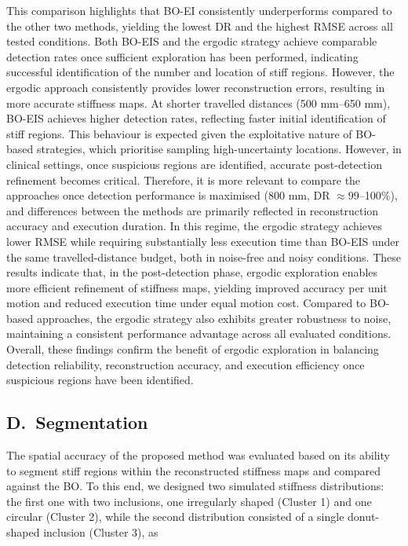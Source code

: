 \documentclass[11pt]{article}
\begin{document}
This comparison highlights that BO-EI consistently underperforms
compared to the other two methods, yielding the lowest DR and the
highest RMSE across all tested conditions. Both BO-EIS and the
ergodic strategy achieve comparable detection rates once sufficient
exploration has been performed, indicating successful identification
of the number and location of stiff regions. However, the ergodic
approach consistently provides lower reconstruction errors,
resulting in more accurate stiffness maps. At shorter travelled
distances (500 mm--650 mm), BO-EIS achieves higher detection rates,
reflecting faster initial identification of stiff regions. This
behaviour is expected given the exploitative nature of BO-based
strategies, which prioritise sampling high-uncertainty locations.
However, in clinical settings, once suspicious regions are
identified, accurate post-detection refinement becomes critical.
Therefore, it is more relevant to compare the approaches once
detection performance is maximised (800 mm, DR $\approx 99$--100\%),
and differences between the methods are primarily reflected in
reconstruction accuracy and execution duration. In this regime, the
ergodic strategy achieves lower RMSE while requiring substantially
less execution time than BO-EIS under the same travelled-distance
budget, both in noise-free and noisy conditions. These results
indicate that, in the post-detection phase, ergodic exploration
enables more efficient refinement of stiffness maps, yielding
improved accuracy per unit motion and reduced execution time under
equal motion cost. Compared to BO-based approaches, the ergodic
strategy also exhibits greater robustness to noise, maintaining a
consistent performance advantage across all evaluated conditions.
Overall, these findings confirm the benefit of ergodic exploration
in balancing detection reliability, reconstruction accuracy, and
execution efficiency once suspicious regions have been identified.

\subsection*{D.\ Segmentation}

The spatial accuracy of the proposed method was evaluated based on
its ability to segment stiff regions within the reconstructed
stiffness maps and compared against the BO. To this end, we designed
two simulated stiffness distributions: the first one with two
inclusions, one irregularly shaped (Cluster 1) and one circular
(Cluster 2), while the second distribution consisted of a single
donut-shaped inclusion (Cluster 3), as
\end{document}
